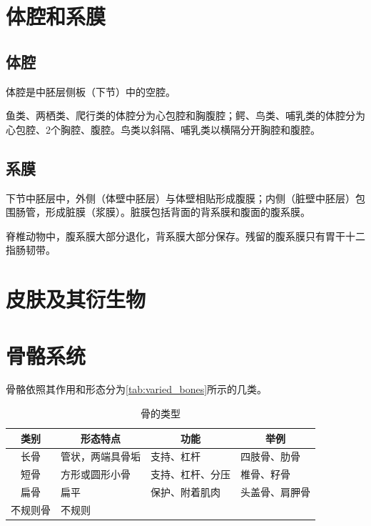 \section{体腔和系膜}

\subsection{体腔}

体腔是中胚层侧板（下节）中的空腔。

鱼类、两栖类、爬行类的体腔分为心包腔和胸腹腔；鳄、鸟类、哺乳类的体腔分为心包腔、2个胸腔、腹腔。鸟类以斜隔、哺乳类以横隔分开胸腔和腹腔。

\subsection{系膜}

下节中胚层中，外侧（体壁中胚层）与体壁相贴形成腹膜；内侧（脏壁中胚层）包围肠管，形成脏膜（浆膜）。脏膜包括背面的背系膜和腹面的腹系膜。

脊椎动物中，腹系膜大部分退化，背系膜大部分保存。残留的腹系膜只有胃干十二指肠韧带。


\section{皮肤及其衍生物}


\section{骨骼系统}

骨骼依照其作用和形态分为\autoref{tab:varied_bones}所示的几类。

\begin{table}[htbp]
	\centering
	\begin{tabularx}{\textwidth}{|c|X|X|X|}
		\hline
		\textbf{类别} & \multicolumn{1}{c|}{\textbf{形态特点}} & \multicolumn{1}{c|}{\textbf{功能}} & \multicolumn{1}{c|}{\textbf{举例}} \\ \hline
		长骨 & 管状，两端具骨垢 & 支持、杠杆 & 四肢骨、肋骨 \\ \hline
		短骨 & 方形或圆形小骨 & 支持、杠杆、分压 & 椎骨、籽骨 \\ \hline
		扁骨 & 扁平 & 保护、附着肌肉 & 头盖骨、肩胛骨 \\ \hline
		不规则骨 & 不规则 &  &  \\ \hline
	\end{tabularx}
	\caption{骨的类型}
	\label{tab:varied_bones}
\end{table}

